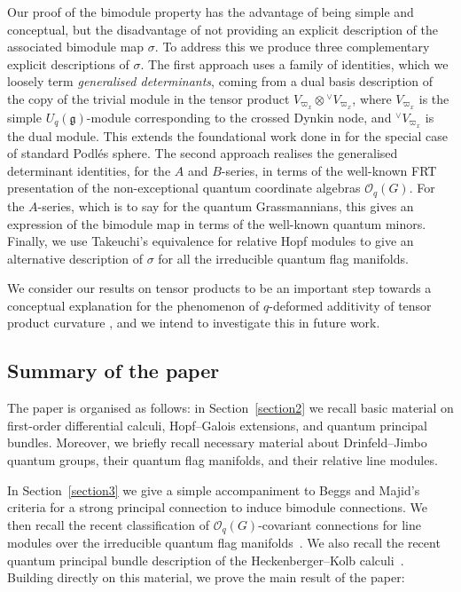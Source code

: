 \documentclass[10pt,a4paper]{amsart}
\numberwithin{equation}{section}
\begin{document}
Our proof of the bimodule property has the advantage of being simple and conceptual, but the disadvantage of not providing an explicit description of the associated bimodule map $\sigma$. To address this we produce three complementary explicit descriptions of $\sigma$. The first approach uses a family of identities, which we loosely term \emph{generalised determinants}, coming from a dual basis description of the copy of the trivial module in the tensor product $V_{\varpi_x} \otimes {}^{\vee}V_{\varpi_x}$, where $V_{\varpi_x}$ is the simple $U_q(\mathfrak{g})$-module corresponding to the crossed Dynkin node, and ${}^{\vee}V_{\varpi_x}$ is the dual module. This extends the foundational work done in \cite{Maj} for the special case of standard Podl\'es sphere.
The second approach realises the generalised determinant identities, for the $A$ and $B$-series, in terms of the well-known FRT presentation \cite{FRT89} of the non-exceptional quantum coordinate algebras $\mathcal{O}_q(G)$. For the $A$-series, which is to say for the quantum Grassmannians, this gives an expression of the bimodule map in terms of the well-known quantum minors. Finally, we use Takeuchi's equivalence for relative Hopf modules \cite{Tak} to give an alternative description of $\sigma$ for all the irreducible quantum flag manifolds.

We consider our results on tensor products to be an important step towards a conceptual explanation for the phenomenon of $q$-deformed additivity of tensor product curvature \cite[Example~5.51]{BeggsMajid:Leabh}, and we intend to investigate this in future work.

\subsection{Summary of the paper}

The paper is organised as follows: in Section~\ref{section2} we recall basic material on first-order differential calculi, Hopf--Galois extensions, and quantum principal bundles. Moreover, we briefly recall necessary material about Drinfeld--Jimbo quantum groups, their quantum flag manifolds, and their relative line modules.


In Section~\ref{section3} we give a simple accompaniment to Beggs and Majid's criteria for a strong principal connection to induce bimodule connections. We then recall the recent classification of $\mathcal{O}_q(G)$-covariant connections for line modules over the irreducible quantum flag manifolds~\cite{HVBQFM}. We also recall the recent quantum principal bundle description of the Heckenberger--Kolb calculi~\cite{CDOBBW}. Building directly on this material, we prove the main result of the paper:
\end{document}
